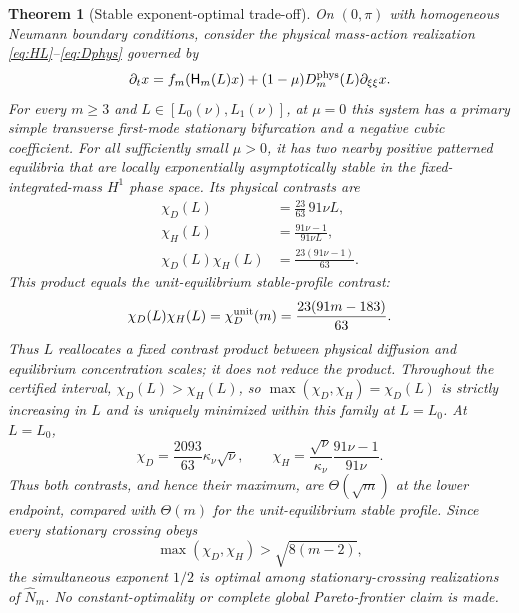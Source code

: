 \documentclass[11pt]{article}
\newtheorem{theorem}{Theorem}[section]
\theoremstyle{definition}
\newcommand{\1}{\mathbf 1}
\begin{document}
\begin{theorem}[Stable exponent-optimal trade-off]\label{thm:pareto}
On $(0,\pi)$ with homogeneous Neumann boundary conditions, consider the
physical mass-action realization \eqref{eq:HL}--\eqref{eq:Dphys} governed by
\[
 \partial_t x=f_m\!\left(\mathsf H_m(L)x\right)
 +(1-\mu)D_m^{\rm phys}(L)\partial_{\xi\xi}x.
\]
For every $m\ge3$ and $L\in[L_0(\nu),L_1(\nu)]$, at $\mu=0$ this system has a
primary simple transverse first-mode stationary bifurcation and a negative
cubic coefficient.  For all sufficiently small $\mu>0$, it has two nearby
positive patterned equilibria that are locally exponentially asymptotically
stable in the fixed-integrated-mass $H^1$ phase space.  Its
physical contrasts are
\begin{align}
 \chi_D(L)&=\frac{23}{63}\,91\nu L,\label{eq:chiDpareto}\\
 \chi_H(L)&=\frac{91\nu-1}{91\nu L},\label{eq:chiHpareto}\\
 \chi_D(L)\chi_H(L)&=\frac{23(91\nu-1)}{63}.\label{eq:productpareto}
\end{align}
This product equals the unit-equilibrium stable-profile contrast:
\[
 \chi_D(L)\chi_H(L)=\chi_D^{\rm unit}(m)
 =\frac{23(91m-183)}{63}.
\]
Thus $L$ reallocates a fixed contrast product between physical diffusion and
equilibrium concentration scales; it does not reduce the product.  Throughout
the certified interval, $\chi_D(L)>\chi_H(L)$, so
$\max(\chi_D,\chi_H)=\chi_D(L)$ is strictly increasing in $L$ and is uniquely
minimized within this family at $L=L_0$.
At $L=L_0$,
\begin{equation}\label{eq:scalingendpoint}
 \chi_D=\frac{2093}{63}\kappa_\nu\sqrt\nu,
 \qquad
 \chi_H=\frac{\sqrt\nu}{\kappa_\nu}\frac{91\nu-1}{91\nu}.
\end{equation}
Thus both contrasts, and hence their maximum, are $\Theta(\sqrt m)$ at the
lower endpoint, compared with $\Theta(m)$ for the unit-equilibrium stable
profile.  Since every stationary crossing
obeys
\begin{equation}\label{eq:minimaxlower}
 \max(\chi_D,\chi_H)>\sqrt{8(m-2)},
\end{equation}
the simultaneous exponent $1/2$ is optimal among stationary-crossing
realizations of $\widehat N_m$.  No constant-optimality or complete global
Pareto-frontier claim is made.
\end{theorem}
\end{document}
